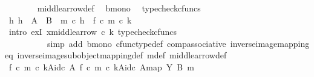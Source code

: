 \begin{isabellebody}
\ \ \ \ \ \ \isamarkupfalse%
\ middle{\isacharunderscore}{\kern0pt}arrow{\isacharunderscore}{\kern0pt}def\ \isamarkupfalse%
\ b{\isacharunderscore}{\kern0pt}mono\ \isamarkupfalse%
\ {\isacharparenleft}{\kern0pt}typecheck{\isacharunderscore}{\kern0pt}cfuncs{\isacharparenright}{\kern0pt}\isanewline
\isanewline
\ \ \ \ \isamarkupfalse%
\ {\isachardoublequoteopen}{\isasymexists}h{\isachardot}{\kern0pt}\ h\ {\isacharcolon}{\kern0pt}\ A\ {\isasymrightarrow}\ B\ {\isasymand}\ m\ {\isasymcirc}\isactrlsub c\ h\ {\isacharequal}{\kern0pt}\ f\ {\isasymcirc}\isactrlsub c\ m{\isacharprime}{\kern0pt}\ {\isasymcirc}\isactrlsub c\ k{\isachardoublequoteclose}\isanewline
\ \ \ \ \ \ \isamarkupfalse%
\ {\isacharparenleft}{\kern0pt}intro\ exI{\isacharbrackleft}{\kern0pt}\ x{\isacharequal}{\kern0pt}{\isachardoublequoteopen}middle{\isacharunderscore}{\kern0pt}arrow\ {\isasymcirc}\isactrlsub c\ k{\isachardoublequoteclose}{\isacharbrackright}{\kern0pt}{\isacharcomma}{\kern0pt}\ typecheck{\isacharunderscore}{\kern0pt}cfuncs{\isacharcomma}{\kern0pt}\ \isanewline
\ \ \ \ \ \ \ \ \ \ simp\ add{\isacharcolon}{\kern0pt}\ b{\isacharunderscore}{\kern0pt}mono\ cfunc{\isacharunderscore}{\kern0pt}type{\isacharunderscore}{\kern0pt}def\ comp{\isacharunderscore}{\kern0pt}associative{}\ inverse{\isacharunderscore}{\kern0pt}image{\isacharunderscore}{\kern0pt}mapping{\isacharunderscore}{\kern0pt}eq\ inverse{\isacharunderscore}{\kern0pt}image{\isacharunderscore}{\kern0pt}subobject{\isacharunderscore}{\kern0pt}mapping{\isacharunderscore}{\kern0pt}def\ m{\isacharprime}{\kern0pt}{\isacharunderscore}{\kern0pt}def\ middle{\isacharunderscore}{\kern0pt}arrow{\isacharunderscore}{\kern0pt}def{\isacharparenright}{\kern0pt}\isanewline
\ \ \isamarkupfalse%
\isanewline
\isanewline
\ \ \isamarkupfalse%
\ \isamarkupfalse%
\ {\isachardoublequoteopen}{\isacharparenleft}{\kern0pt}{\isacharparenleft}{\kern0pt}f\ {\isasymcirc}\isactrlsub c\ m{\isacharprime}{\kern0pt}\ {\isasymcirc}\isactrlsub c\ k{\isacharparenright}{\kern0pt}{\isasymlparr}A{\isasymrparr}\isactrlbsub id\isactrlsub c\ A\isactrlesub {\isacharcomma}{\kern0pt}\ {\isacharbrackleft}{\kern0pt}{\isacharparenleft}{\kern0pt}f\ {\isasymcirc}\isactrlsub c\ m{\isacharprime}{\kern0pt}\ {\isasymcirc}\isactrlsub c\ k{\isacharparenright}{\kern0pt}{\isasymlparr}A{\isasymrparr}\isactrlbsub id\isactrlsub c\ A\isactrlesub {\isacharbrackright}{\kern0pt}map{\isacharparenright}{\kern0pt}\ {\isasymsubseteq}\isactrlbsub Y\isactrlesub \ {\isacharparenleft}{\kern0pt}B{\isacharcomma}{\kern0pt}\ m{\isacharparenright}{\kern0pt}{\isachardoublequoteclose}\isanewline

\end{isabellebody}
